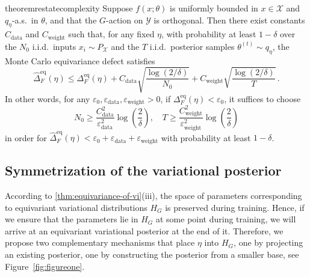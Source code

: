 \documentclass{article}
\begin{document}
\begin{restatable}{theorem}{restatecomplexity}
\label{thm:complexity-for-G-e-equivariance}
 Suppose $f(x;\theta)$ is uniformly bounded in $x \in \mathcal{X}$ and 
    $q_{\eta}$-a.s.\ in $\theta$, and that the $G$-action on $\mathcal{Y}$ 
    is orthogonal. Then there exist constants $C_{\mathrm{data}}$ and $C_{\mathrm{weight}}$ such that, for any fixed $\eta$, with probability at least $1-\delta$ over the $N_0$ i.i.d.\ inputs $x_i \sim P_\mathcal{X}$ and the $T$ i.i.d.\ posterior samples $\theta^{(t)} \sim q_\eta$, the Monte Carlo equivariance defect satisfies
    \begin{equation}
        \widehat{\Delta}^{\mathrm{eq}}_{F}(\eta) \leq  \Delta^{\mathrm{eq}}_{F}(\eta)+ C_{\mathrm{data}}\sqrt{\frac{\log(2/\delta)}{N_{0}}} + C_{\mathrm{weight}}\sqrt{\frac{\log(2/\delta)}{T}}\,.
    \end{equation}
   In other words, for any $\varepsilon_{0},\varepsilon_{\mathrm{data}}, \varepsilon_{\mathrm{weight}} >0$, if $\Delta_F^{\mathrm{eq}}(\eta)<\varepsilon_0$, it suffices to choose
   \begin{equation}
        N_{0} \ge \frac{C_{\mathrm{data}}^{2}}{\varepsilon_{\mathrm{data}}^{2}}\log\left(\frac{2}{\delta}\right), \quad T \ge \frac{C_{\mathrm{weight}}^{2}}{\varepsilon_{\mathrm{weight}}^{2}}\log\left(\frac{2}{\delta}\right)
    \end{equation}
    in order for
    $\widehat{\Delta}_F^{\mathrm{eq}}(\eta) < \varepsilon_0 + \varepsilon_{\mathrm{data}}+\varepsilon_{\mathrm{weight}}$ with probability at least $1-\delta$.
\end{restatable}



\subsection{Symmetrization of the variational posterior}
\label{sec:symmetrization-of-the-variational-posterior}


According to \cref{thm:equivariance-of-vi}(iii), the space of parameters corresponding to equivariant variational distributions $H_{G}$ is preserved during training. Hence, if we ensure that the parameters lie in $H_{G}$ at some point during training, we will arrive at an equivariant variational posterior at the end of it. Therefore, we propose two complementary mechanisms that place $\eta$ into $H_{G}$, one by projecting an existing posterior, one by constructing the posterior from a smaller base, see Figure~\ref{fig:figureone}.
\end{document}
